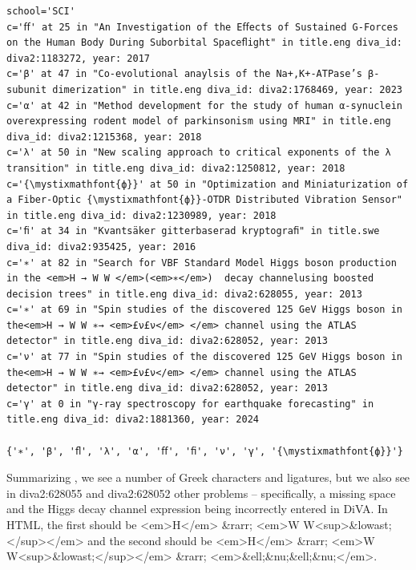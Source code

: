 \documentclass[12pt, twoside]{article}
\begin{document}
\begin{Verbatim}[breaklines=true, commandchars=\\\{\}]
school='SCI'
c='ﬀ' at 25 in "An Investigation of the Eﬀects of Sustained G-Forces on the Human Body During Suborbital Spaceﬂight" in title.eng diva_id: diva2:1183272, year: 2017
c='β' at 47 in "Co-evolutional anaylsis of the Na+,K+-ATPase’s β-subunit dimerization" in title.eng diva_id: diva2:1768469, year: 2023
c='α' at 42 in "Method development for the study of human α-synuclein overexpressing rodent model of parkinsonism using MRI" in title.eng diva_id: diva2:1215368, year: 2018
c='λ' at 50 in "New scaling approach to critical exponents of the λ transition" in title.eng diva_id: diva2:1250812, year: 2018
c='{\mystixmathfont{ф}}' at 50 in "Optimization and Miniaturization of a Fiber-Optic {\mystixmathfont{ф}}-OTDR Distributed Vibration Sensor" in title.eng diva_id: diva2:1230989, year: 2018
c='ﬁ' at 34 in "Kvantsäker gitterbaserad kryptograﬁ" in title.swe diva_id: diva2:935425, year: 2016
c='∗' at 82 in "Search for VBF Standard Model Higgs boson production in the <em>H → W W </em>(<em>∗</em>)  decay channelusing boosted decision trees" in title.eng diva_id: diva2:628055, year: 2013
c='∗' at 69 in "Spin studies of the discovered 125 GeV Higgs boson in the<em>H → W W ∗→ <em>£ν£ν</em> </em> channel using the ATLAS detector" in title.eng diva_id: diva2:628052, year: 2013
c='ν' at 77 in "Spin studies of the discovered 125 GeV Higgs boson in the<em>H → W W ∗→ <em>£ν£ν</em> </em> channel using the ATLAS detector" in title.eng diva_id: diva2:628052, year: 2013
c='γ' at 0 in "γ-ray spectroscopy for earthquake forecasting" in title.eng diva_id: diva2:1881360, year: 2024

{'∗', 'β', 'ﬂ', 'λ', 'α', 'ﬀ', 'ﬁ', 'ν', 'γ', '{\mystixmathfont{ф}}'}
\end{Verbatim}
\FloatBarrier
Summarizing , we see a number of Greek characters and ligatures, but we also see in diva2:628055 and diva2:628052 other problems -- specifically, a missing space and the Higgs decay channel expression being incorrectly entered in \gls{DiVA}. In \gls{HTML}, the first should be <em>H</em> \&rarr; <em>W W<sup>\&lowast;</sup></em> and the second should be <em>H</em> \&rarr; <em>W W<sup>\&lowast;</sup></em> \&rarr; <em>\&ell;\&nu;\&ell;\&nu;</em>.
\clearpage
\end{document}
